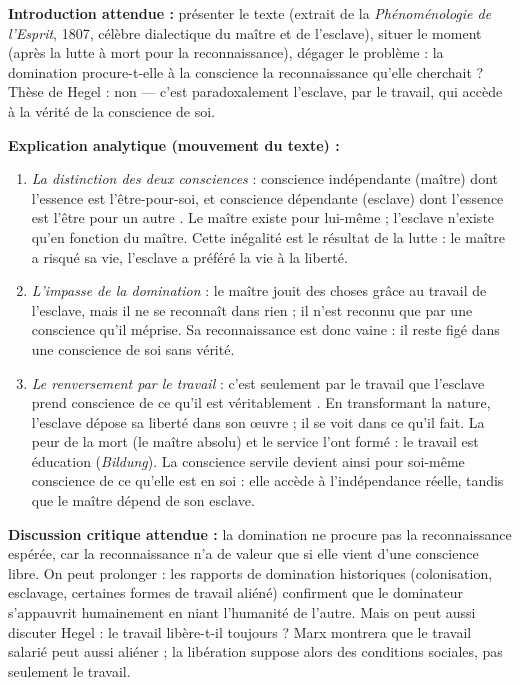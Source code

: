 \documentclass[11pt]{article}
\begin{document}
\begin{corrige}
\textbf{Introduction attendue :} présenter le texte (extrait de la \emph{Phénoménologie de l'Esprit}, 1807, célèbre dialectique du maître et de l'esclave), situer le moment (après la lutte à mort pour la reconnaissance), dégager le problème : la domination procure-t-elle à la conscience la reconnaissance qu'elle cherchait ? Thèse de Hegel : non — c'est paradoxalement l'esclave, par le travail, qui accède à la vérité de la conscience de soi.

\textbf{Explication analytique (mouvement du texte) :}
\begin{enumerate}
\item \emph{La distinction des deux consciences} : \guillemotleft conscience indépendante \guillemotright (maître) dont l'essence est l'être-pour-soi, et \guillemotleft conscience dépendante \guillemotright (esclave) dont l'essence est \guillemotleft l'être pour un autre \guillemotright. Le maître existe pour lui-même ; l'esclave n'existe qu'en fonction du maître. Cette inégalité est le résultat de la lutte : le maître a risqué sa vie, l'esclave a préféré la vie à la liberté.
\item \emph{L'impasse de la domination} : le maître jouit des choses grâce au travail de l'esclave, mais il ne se reconnaît dans rien ; il n'est reconnu que par une conscience qu'il méprise. Sa reconnaissance est donc vaine : il reste figé dans une \guillemotleft conscience de soi \guillemotright sans vérité.
\item \emph{Le renversement par le travail} : \guillemotleft c'est seulement par le travail que l'esclave prend conscience de ce qu'il est véritablement \guillemotright. En transformant la nature, l'esclave dépose sa liberté dans son œuvre ; il se voit dans ce qu'il fait. La peur de la mort (le maître absolu) et le service l'ont formé : le travail est éducation (\emph{Bildung}). La conscience servile devient ainsi \guillemotleft pour soi-même conscience de ce qu'elle est en soi \guillemotright : elle accède à l'indépendance réelle, tandis que le maître dépend de son esclave.
\end{enumerate}

\textbf{Discussion critique attendue :} la domination ne procure pas la reconnaissance espérée, car la reconnaissance n'a de valeur que si elle vient d'une conscience libre. On peut prolonger : les rapports de domination historiques (colonisation, esclavage, certaines formes de travail aliéné) confirment que le dominateur s'appauvrit humainement en niant l'humanité de l'autre. Mais on peut aussi discuter Hegel : le travail libère-t-il toujours ? Marx montrera que le travail salarié peut aussi aliéner ; la libération suppose alors des conditions sociales, pas seulement le travail.


\end{corrige}
\end{document}
